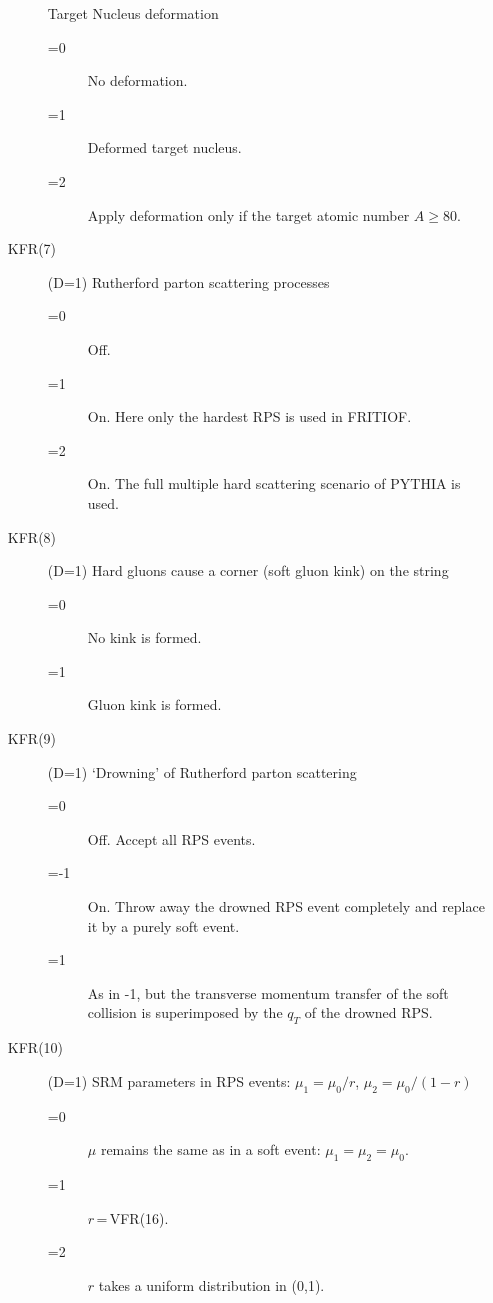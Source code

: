 \begin{itemize}
\begin{description}
       Target Nucleus deformation
      \begin{description}
       \item[=0] No deformation.
       \item[=1] Deformed target nucleus.
       \item[=2] Apply deformation only if the target atomic number $A\geq 80$.  
      \end{description}
\item[KFR(7)] (D=1) 
       Rutherford parton scattering processes
      \begin{description}
       \item[=0] Off.
       \item[=1] On. Here only the hardest RPS is used in FRITIOF.    
       \item[=2] On. The full multiple hard scattering scenario of PYTHIA
               is used.
      \end{description}
\item[KFR(8)] (D=1) 
      Hard gluons cause a corner (soft gluon kink) on the string
      \begin{description}
       \item[=0] No kink is formed. 
       \item[=1] Gluon kink is formed.
      \end{description}
\item[KFR(9)] (D=1)
        `Drowning' of Rutherford parton scattering 
      \begin{description}
       \item[=0] Off. Accept all RPS events.    
       \item[=-1] On. Throw away the drowned RPS event completely 
                  and replace it by a purely soft event.
       \item[=1] As in -1, but the 
            transverse momentum transfer of the soft collision is superimposed
            by the $q_T$ of the drowned RPS.  
      \end{description}
\item[KFR(10)] (D=1) 
        SRM parameters in RPS events: $\mu_1=\mu_0/r$, $\mu_2=\mu_0/(1-r)$
      \begin{description}
      \item[=0] $\mu$ remains the same as in a soft event: $\mu_1=\mu_2=\mu_0$.  
      \item[=1] $r$\,=\,VFR(16). 
      \item[=2] $r$ takes a uniform distribution in (0,1).
      \end{description}

\end{description}
\end{itemize}
